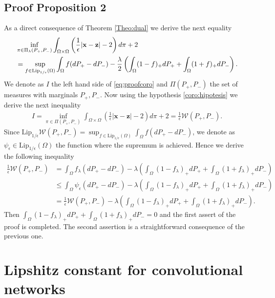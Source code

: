 \subsection{Proof Proposition 2}
As a direct consequence of Theorem \ref{Theo:dual} we derive the next equality 
 \begin{align}\label{eq:proofcoro}
\begin{split}
	&\inf_{\pi \in\Pi_{\lambda}(P_+, P_-)}\int_{\Omega\times \Omega}\left(\frac{1}{\epsilon}| {\textbf{x}}-{\textbf{{{\textbf{z}}}}} |-2\right)d\pi  +2\\&= \sup_{f\in \text{Lip}_{1/\epsilon}(\Omega)}\int_{\Omega}f(dP_+-dP_-)-\frac{\lambda}{2} \left( \int_{\Omega}(1-f)_+dP_+ +\int_{\Omega}(1+f)_+dP_-\right).
	\end{split}
\end{align}
We denote as $I$ the left hand side of \eqref{eq:proofcoro} and $\Pi(P_+, P_-)$ the set of measures with marginals $P_+, P_-$. Now using the hypothesis \eqref{coro:hipotesis} we derive the next inequality  
\begin{align*}
	I=\inf_{\pi \in\Pi(P_+, P_-)}\int_{\Omega\times \Omega}\left(\frac{1}{\epsilon}|{\textbf{x}}-{{\textbf{z}}} |-2\right)d\pi+2= \frac{1}{\epsilon}\mathcal{W}(P_+, P_-).
\end{align*}
Since { $\text{Lip}_{1/\epsilon}\mathcal{W}(P_+, P_-)=\sup_{f\in \text{Lip}_{1/\epsilon}(\Omega)}\int_{\Omega}f(dP_+-dP_-)$}, we denote as $\psi_{\epsilon}\in \text{Lip}_{1/\epsilon}(\Omega)$ the function where the supremum is achieved. Hence we derive the following inequality
\begin{align*}
  \frac{1}{\epsilon}\mathcal{W}(P_+, P_-)&= \int_{\Omega}f_{\lambda}(dP_+-dP_-)-\lambda \left( \int_{\Omega}(1-f_{\lambda})_+dP_+ +\int_{\Omega}(1+f_{\lambda})_+dP_-\right)\\
	&\leq \int_{\Omega}\psi_{\epsilon} (dP_+-dP_-)-\lambda \left( \int_{\Omega}(1-f_{\lambda})_+dP_+ +\int_{\Omega}(1+f_{\lambda})_+dP_-\right)\\
	&=\frac{1}{\epsilon}\mathcal{W}(P_+, P_-) -\lambda \left( \int_{\Omega}(1-f_{\lambda})_+dP_+ +\int_{\Omega}(1+f_{\lambda})_+dP_-\right).
\end{align*}
Then $ \int_{\Omega}(1-f_{\lambda})_+dP_+ +\int_{\Omega}(1+f_{\lambda})_+dP_-=0$ and the first assert of the proof is completed. The second assertion   is a straightforward consequence of the previous one.



\section{Lipshitz constant for convolutional networks}

